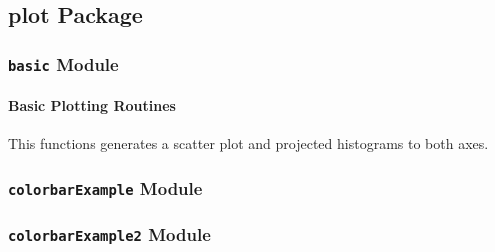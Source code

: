 \documentclass[letterpaper,10pt,english]{sphinxmanual}
\begin{document}
\subsection{plot Package}
\label{SamPy.plot::doc}\label{SamPy.plot:plot-package}

\subsubsection{\texttt{basic} Module}
\label{SamPy.plot:module-SamPy.plot.basic}\label{SamPy.plot:basic-module}

\paragraph{Basic Plotting Routines}
\label{SamPy.plot:basic-plotting-routines}

\begin{fulllineitems}
\label{SamPy.plot:SamPy.plot.basic.scatterHistograms}
This functions generates a scatter plot and
projected histograms to both axes.

\end{fulllineitems}



\subsubsection{\texttt{colorbarExample} Module}
\label{SamPy.plot:colorbarexample-module}\label{SamPy.plot:module-SamPy.plot.colorbarExample}

\begin{fulllineitems}
\label{SamPy.plot:SamPy.plot.colorbarExample.make_axes}
\end{fulllineitems}



\subsubsection{\texttt{colorbarExample2} Module}
\label{SamPy.plot:module-SamPy.plot.colorbarExample2}\label{SamPy.plot:colorbarexample2-module}
\end{document}
